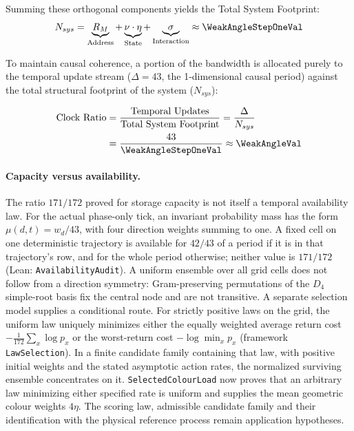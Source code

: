 Summing these orthogonal components yields the Total System Footprint:
\begin{equation}
N_{sys} = \underbrace{R_M}_{\text{Address}}
+ \underbrace{\nu \cdot \eta}_{\text{State}}
+ \underbrace{\sigma}_{\text{Interaction}}
\approx \WeakAngleStepOneVal
\end{equation}

To maintain causal coherence, a portion of the bandwidth is allocated purely to the temporal update stream ($\Delta = 43$, the 1-dimensional causal period) against the total structural footprint of the system ($N_{sys}$):

\begin{equation}
\begin{split}
\text{Clock Ratio} &= \frac{\text{Temporal Updates}}{\text{Total System Footprint}} = \frac{\Delta}{N_{sys}} \\
&= \frac{43}{\WeakAngleStepOneVal} \approx \mathbf{\WeakAngleVal}
\end{split}
\end{equation}

\paragraph{Capacity versus availability.}
The ratio $171/172$ proved for storage capacity is not itself a temporal
availability law. For the actual phase-only tick, an invariant probability mass
has the form $\mu(d,t)=w_d/43$, with four direction weights summing to one.
A fixed cell on one deterministic trajectory is available for $42/43$ of a
period if it is in that trajectory's row, and for the whole period otherwise;
neither value is $171/172$ (Lean: \texttt{AvailabilityAudit}). A uniform ensemble over all grid cells does not follow from a direction symmetry: Gram-preserving permutations of the $D_4$ simple-root basis fix the central node and are not transitive. A separate selection model supplies a conditional route. For strictly positive laws on the grid, the uniform law uniquely minimizes either the equally weighted average return cost $-\frac1{172}\sum_x\log p_x$ or the worst-return cost $-\log\min_x p_x$ (framework \texttt{LawSelection}). In a finite candidate family containing that law, with positive initial weights and the stated asymptotic action rates, the normalized surviving ensemble concentrates on it. \texttt{SelectedColourLoad} now proves that an arbitrary law minimizing either specified rate is uniform and supplies the mean geometric colour weights $4\eta$. The scoring law, admissible candidate family and their identification with the physical reference process remain application hypotheses.

